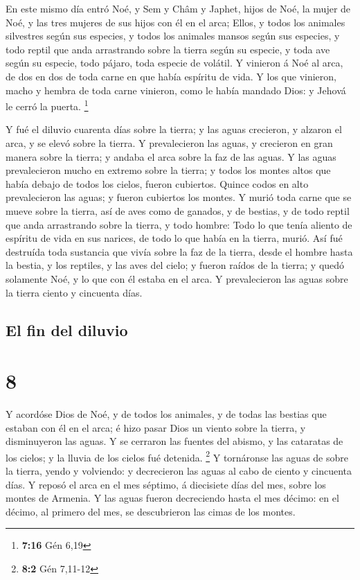  En este mismo día entró Noé, y Sem y Châm y Japhet,
hijos de Noé, la mujer de Noé, y las tres mujeres de sus hijos con él en
el arca;  Ellos, y todos los animales silvestres según
sus especies, y todos los animales mansos según sus especies, y todo
reptil que anda arrastrando sobre la tierra según su especie, y toda ave
según su especie, todo pájaro, toda especie de volátil. 
Y vinieron á Noé al arca, de dos en dos de toda carne en que había
espíritu de vida.  Y los que vinieron, macho y hembra de
toda carne vinieron, como le había mandado Dios: y Jehová le cerró la
puerta. \footnote{\textbf{7:16} Gén 6,19}

 Y fué el diluvio cuarenta días sobre la tierra; y las
aguas crecieron, y alzaron el arca, y se elevó sobre la tierra.
 Y prevalecieron las aguas, y crecieron en gran manera
sobre la tierra; y andaba el arca sobre la faz de las aguas.
 Y las aguas prevalecieron mucho en extremo sobre la
tierra; y todos los montes altos que había debajo de todos los cielos,
fueron cubiertos.  Quince codos en alto prevalecieron las
aguas; y fueron cubiertos los montes.  Y murió toda carne
que se mueve sobre la tierra, así de aves como de ganados, y de bestias,
y de todo reptil que anda arrastrando sobre la tierra, y todo hombre:
 Todo lo que tenía aliento de espíritu de vida en sus
narices, de todo lo que había en la tierra, murió.  Así
fué destruída toda sustancia que vivía sobre la faz de la tierra, desde
el hombre hasta la bestia, y los reptiles, y las aves del cielo; y
fueron raídos de la tierra; y quedó solamente Noé, y lo que con él
estaba en el arca.  Y prevalecieron las aguas sobre la
tierra ciento y cincuenta días.

\hypertarget{el-fin-del-diluvio}{%
\subsection{El fin del diluvio}\label{el-fin-del-diluvio}}

\hypertarget{section-7}{%
\section{8}\label{section-7}}

 Y acordóse Dios de Noé, y de todos los animales, y de
todas las bestias que estaban con él en el arca; é hizo pasar Dios un
viento sobre la tierra, y disminuyeron las aguas.  Y se
cerraron las fuentes del abismo, y las cataratas de los cielos; y la
lluvia de los cielos fué detenida. \footnote{\textbf{8:2} Gén 7,11-12}
 Y tornáronse las aguas de sobre la tierra, yendo y
volviendo: y decrecieron las aguas al cabo de ciento y cincuenta días.
 Y reposó el arca en el mes séptimo, á diecisiete días del
mes, sobre los montes de Armenia.  Y las aguas fueron
decreciendo hasta el mes décimo: en el décimo, al primero del mes, se
descubrieron las cimas de los montes.

